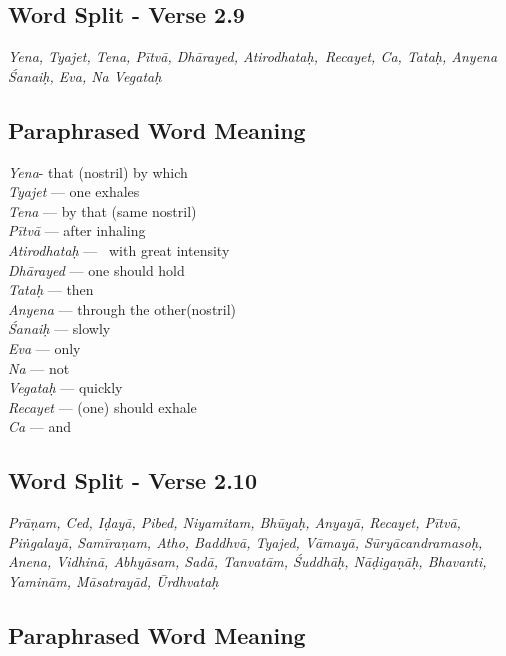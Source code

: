 \subsection*{Word Split - Verse 2.9}


\textit{Yena, Tyajet, Tena, Pītvā, Dhārayed, Atirodhataḥ, Recayet, Ca,  Tataḥ, Anyena Śanaiḥ, Eva, Na Vegataḥ}

\subsection*{Paraphrased Word Meaning}


\begin{multicols}{2}
\textit{Yena}- that (nostril) by which\\
\textit{Tyajet} --- one exhales\\
\textit{Tena} --- by that (same nostril) \\
\textit{Pītvā} --- after inhaling \\
\textit{Atirodhataḥ} ---  with great intensity \\
\textit{Dhārayed} --- one should hold \\
\textit{Tataḥ} ---  then \\
\textit{Anyena} --- through the other(nostril)\\
\textit{Śanaiḥ} --- slowly\\
\textit{Eva} --- only\\
\textit{Na} --- not \\
\textit{Vegataḥ} --- quickly \\
\textit{Recayet} --- (one) should exhale \\
\textit{Ca}  --- and
\end{multicols}

\subsection*{Word Split - Verse 2.10}


\textit{Prāṇam, Ced, Iḍayā, Pibed, Niyamitam, Bhūyaḥ, Anyayā, Recayet,  Pītvā, Piṅgalayā, Samīraṇam, Atho, Baddhvā, Tyajed, Vāmayā, Sūryācandramasoḥ, Anena, Vidhinā, Abhyāsam, Sadā, Tanvatām, Śuddhāḥ, Nāḍigaṇāḥ, Bhavanti, Yaminām, Māsatrayād, Ūrdhvataḥ}

\subsection*{Paraphrased Word Meaning}



